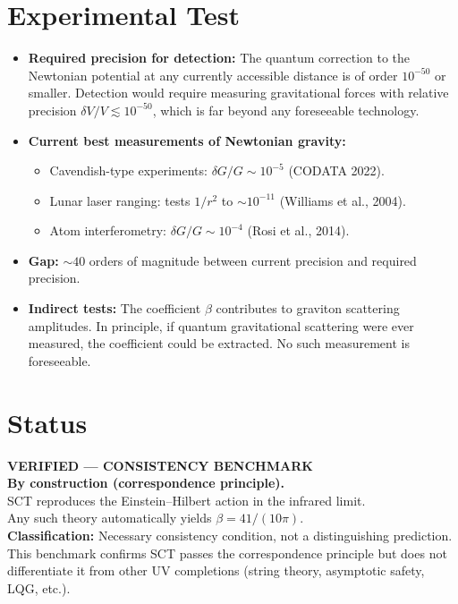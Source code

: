 \documentclass[11pt,a4paper]{article}
\begin{document}
\section{Experimental Test}

\begin{itemize}[leftmargin=2em]
  \item \textbf{Required precision for detection:}
    The quantum correction to the Newtonian potential at any currently accessible distance is of order $10^{-50}$ or smaller. Detection would require measuring gravitational forces with relative precision $\delta V/V \lesssim 10^{-50}$, which is far beyond any foreseeable technology.

  \item \textbf{Current best measurements of Newtonian gravity:}
    \begin{itemize}
      \item Cavendish-type experiments: $\delta G/G \sim 10^{-5}$ (CODATA 2022).
      \item Lunar laser ranging: tests $1/r^2$ to $\sim 10^{-11}$ (Williams et al., 2004).
      \item Atom interferometry: $\delta G/G \sim 10^{-4}$ (Rosi et al., 2014).
    \end{itemize}

  \item \textbf{Gap:} $\sim 40$ orders of magnitude between current precision and required precision.

  \item \textbf{Indirect tests:} The coefficient $\beta$ contributes to graviton scattering amplitudes. In principle, if quantum gravitational scattering were ever measured, the coefficient could be extracted. No such measurement is foreseeable.
\end{itemize}

\section{Status}

\begin{center}
\colorbox{verified!15}{\parbox{0.8\textwidth}{\centering
  \textbf{\color{verified}\Large VERIFIED --- CONSISTENCY BENCHMARK}\\[6pt]
  \textbf{By construction (correspondence principle).}\\[4pt]
  SCT reproduces the Einstein--Hilbert action in the infrared limit.\\
  Any such theory automatically yields $\beta = 41/(10\pi)$.\\[4pt]
  \textbf{Classification:} Necessary consistency condition, not a distinguishing prediction.\\
  This benchmark confirms SCT passes the correspondence principle but does not\\
  differentiate it from other UV completions (string theory, asymptotic safety, LQG, etc.).
}}
\end{center}
\end{document}
